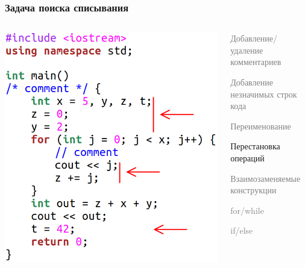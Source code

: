 \documentclass[10pt]{beamer}
\begin{document}
\begin{frame}[fragile]\frametitle{Задача поиска списывания}
	\begin{columns}[T]
		\centering
		\includegraphics[scale=0.7]{reordering.png}
		
		\centering
		\begin{itemize}
			\item \textcolor{gray}{Добавление/удаление комментариев
				\item Добавление незначимых строк кода
			\item Переименование}
				\item Перестановка операций
				\textcolor{gray}{
				\item Взаимозаменяемые конструкции
			}
			\begin{itemize}
				\item \textcolor{gray}{for/while
					\item if/else
				}
			\end{itemize}
		\end{itemize}
	\end{columns}
\end{frame}
\end{document}

